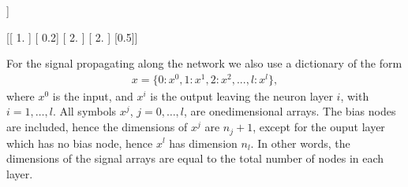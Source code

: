 \documentclass[letterpaper,10pt,english]{jupyterBook}
\begin{document}
\begin{sphinxVerbatim}[commandchars=\\\{\}]
\PYG{p}{[}\PYG{p}{[}\PYG{p}{]}\PYG{p}{[}\PYG{p}{]}\PYG{p}{[}\PYG{p}{]}\PYG{p}{]}\PYG{p}{[}\PYG{p}{[}\PYG{p}{]}\PYG{p}{[}\PYG{p}{]}\PYG{p}{[}\PYG{p}{]}\PYG{p}{[}\PYG{p}{]}\PYG{p}{[}\PYG{p}{]}\PYG{p}{]}

\PYG{p}{[}\PYG{p}{]}
\PYG{p}{[}\PYG{p}{]}
\end{sphinxVerbatim}

\begin{sphinxVerbatim}[commandchars=\\\{\}]
[[ 1.   2.   1.   1. ]
 [ 2.  \PYGZhy{}3.   0.2  2. ]
 [\PYGZhy{}3.  \PYGZhy{}3.   5.   7. ]]

[[ 1. ]
 [ 0.2]
 [ 2. ]
 [ 2. ]
 [\PYGZhy{}0.5]]
\end{sphinxVerbatim}

\sphinxAtStartPar
For the signal propagating along the network we also use a dictionary of the form
\begin{equation*}
\begin{split}x=\{0: x^0, 1: x^1, 2: x^2, ..., l: x^l\},\end{split}
\end{equation*}
\sphinxAtStartPar
where \(x^0\) is the input, and \(x^i\) is the output leaving the neuron layer \(i\), with \(i=1, \dots, l\). All symbols \(x^j\), \(j=0, \dots, l\), are one\sphinxhyphen{}dimensional arrays. The bias nodes are included, hence the dimensions of \(x^j\) are \(n_j+1\), except for the ouput layer which has no bias node, hence \(x^l\) has dimension \(n_l\). In other words, the dimensions of the signal arrays are equal to the total number of nodes in each layer.
\end{document}
